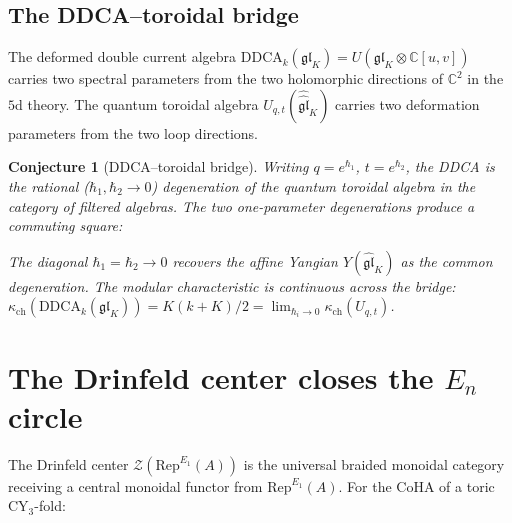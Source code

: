 \documentclass[11pt]{article}
\theoremstyle{plain}
\newtheorem{conjecture}[theorem]{Conjecture}
\theoremstyle{definition}
\theoremstyle{remark}
\newcommand{\fgl}{\mathfrak{gl}}
\newcommand{\cZ}{\mathcal{Z}}
\newcommand{\bC}{\mathbb{C}}
\newcommand{\Eone}{E_1}
\newcommand{\En}{E_n}
\newcommand{\Rep}{\mathrm{Rep}}
\begin{document}
\subsection{The DDCA--toroidal bridge}

The deformed double current algebra
$\mathrm{DDCA}_k(\fgl_K) = U(\fgl_K \otimes \bC[u, v])$ carries
two spectral parameters from the two holomorphic directions of
$\bC^2$ in the $5$d theory.  The quantum toroidal algebra
$U_{q,t}(\widehat{\widehat{\fgl}}_K)$ carries two deformation
parameters from the two loop directions.

\begin{conjecture}[DDCA--toroidal bridge]
\label{conj:v3-qg-ddca-toroidal}
Writing $q = e^{\hbar_1}$, $t = e^{\hbar_2}$, the DDCA is the
rational ($\hbar_1, \hbar_2 \to 0$) degeneration of the quantum
toroidal algebra in the category of filtered algebras.  The two
one-parameter degenerations produce a commuting square:
\begin{center}
\end{center}
The diagonal $\hbar_1 = \hbar_2 \to 0$ recovers the affine Yangian
$Y(\widehat{\fgl}_K)$ as the common degeneration.  The modular
characteristic is continuous across the bridge:
$\kappa_{\mathrm{ch}}(\mathrm{DDCA}_k(\fgl_K))
= K(k+K)/2 = \lim_{\hbar_i \to 0}
\kappa_{\mathrm{ch}}(U_{q,t})$.
\end{conjecture}



\section{The Drinfeld center closes the $\En$ circle}
\label{sec:drinfeld-center}

The Drinfeld center $\cZ(\Rep^{\Eone}(A))$ is the universal
braided monoidal category receiving a central monoidal functor from
$\Rep^{\Eone}(A)$.  For the CoHA of a toric CY$_3$-fold:
\end{document}
